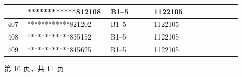 \documentclass[UTF8,10pt,a4paper,fontset=fandol]{ctexart}
\newcommand{\fieldvalue}[1]{#1}
\begin{document}
\begin{center}
\begin{tabular}{|p{0.08\linewidth}|p{0.29\linewidth}|p{0.18\linewidth}|p{0.18\linewidth}|p{0.18\linewidth}|}
&
\fieldvalue{************812108}
&
\fieldvalue{B1--5}
&
\fieldvalue{1122105}
& \\ \hline
\fieldvalue{407}
&
\fieldvalue{************821202}
&
\fieldvalue{B1--5}
&
\fieldvalue{1122105}
& \\ \hline
\fieldvalue{408}
&
\fieldvalue{************835152}
&
\fieldvalue{B1--5}
&
\fieldvalue{1122105}
& \\ \hline
\fieldvalue{409}
&
\fieldvalue{************845625}
&
\fieldvalue{B1--5}
&
\fieldvalue{1122105}
& \\ \hline
\end{tabular}

\vspace{8pt}

第 10 页，共 11 页
\end{center}

\newpage
\end{document}
